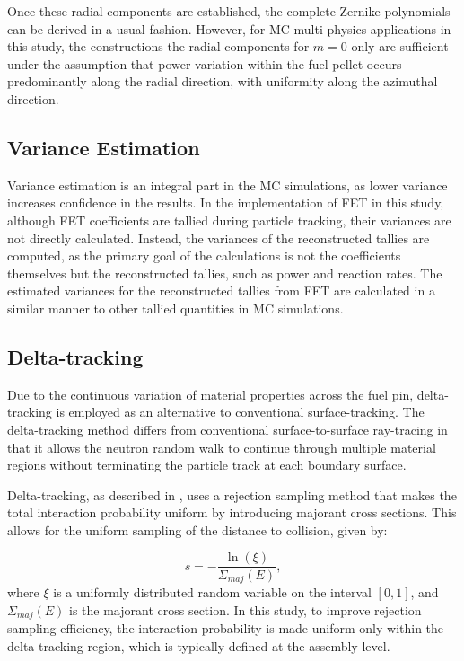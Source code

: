 Once these radial components are established, the complete Zernike polynomials can be derived in a usual fashion. However, for MC multi-physics applications in this study, the constructions the radial components for $m=0$ only are sufficient under the assumption that power variation within the fuel pellet occurs predominantly along the radial direction, with uniformity along the azimuthal direction.

\subsection{Variance Estimation}\label{sec22a}

Variance estimation is an integral part in the MC simulations, as lower variance increases confidence in the results. In the implementation of FET in this study, although FET coefficients are tallied during particle tracking, their variances are not directly calculated. Instead, the variances of the reconstructed tallies are computed, as the primary goal of the calculations is not the coefficients themselves but the reconstructed tallies, such as power and reaction rates. The estimated variances for the reconstructed tallies from FET are calculated in a similar manner to other tallied quantities in MC simulations.

\subsection{Delta-tracking} \label{sec23}

Due to the continuous variation of material properties across the fuel pin, delta-tracking is employed as an alternative to conventional surface-tracking. The delta-tracking method differs from conventional surface-to-surface ray-tracing in that it allows the neutron random walk to continue through multiple material regions without terminating the particle track at each boundary surface.

Delta-tracking, as described in \cite{leppanen_2017, woodcock}, uses a rejection sampling method that makes the total interaction probability uniform by introducing majorant cross sections. This allows for the uniform sampling of the distance to collision, given by:

\[
    s = -\frac{\ln{\left(\xi\right)}}{\Sigma_{maj}(E)},
\]
where \(\xi\) is a uniformly distributed random variable on the interval \([0,1]\), and \(\Sigma_{maj}(E)\) is the majorant cross section. In this study, to improve rejection sampling efficiency, the interaction probability is made uniform only within the delta-tracking region, which is typically defined at the assembly level. 

